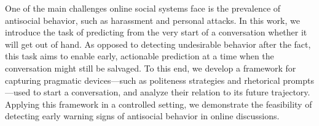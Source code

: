 One of the main challenges online social systems face is the prevalence of antisocial behavior, such as harassment and personal attacks.  In this work, we introduce the task of predicting from the very start of a conversation whether it will get out of hand.  As opposed to detecting undesirable behavior after the fact, this task aims to enable early, actionable prediction at a time when the conversation might still be salvaged. To this end, we develop a framework for capturing pragmatic devices---such as politeness strategies and rhetorical prompts---used to start a conversation, and analyze their relation to its future trajectory. Applying this framework in a controlled setting, we demonstrate the feasibility of detecting early warning signs of antisocial behavior in online discussions.
